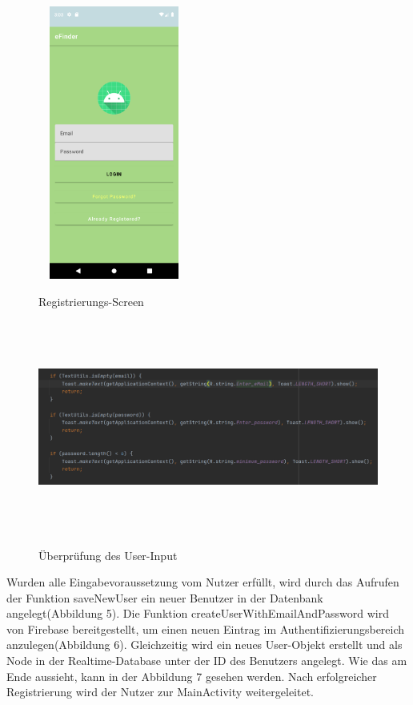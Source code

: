 \documentclass[12pt, a4paper, oneside]{article}
\begin{document}
\begin{figure}
\includegraphics[width=5cm, height=9cm]{Registrierungs-Screen.png}
\centering
\label{register}
\caption{Registrierungs-Screen}
\end{figure}
\begin{figure}
\includegraphics[width=1\textwidth, height=7cm]{SignUp_check.png}
\centering
\label{input_check}
\caption{Überprüfung des User-Input}
\end{figure}
Wurden alle Eingabevoraussetzung vom Nutzer erfüllt, wird durch das Aufrufen der Funktion saveNewUser ein neuer Benutzer in der Datenbank angelegt(Abbildung 5). Die Funktion createUserWithEmailAndPassword wird von Firebase bereitgestellt, um einen neuen Eintrag im Authentifizierungsbereich anzulegen(Abbildung 6). Gleichzeitig wird ein neues User-Objekt erstellt und als Node in der Realtime-Database unter der ID des Benutzers angelegt. Wie das am Ende aussieht, kann in der Abbildung 7 gesehen werden. Nach erfolgreicher Registrierung wird der Nutzer zur MainActivity weitergeleitet. 
\end{document}

